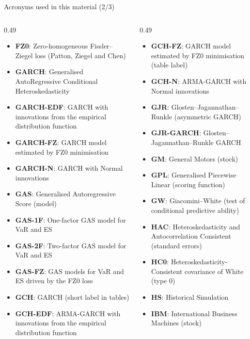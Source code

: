 \begin{frame}{Acronyms used in this material (2/3)}
\begin{columns}[T]
\begin{column}{0.49\textwidth}
\begin{itemize}\setlength{\itemsep}{0pt}
    \item \textbf{FZ0}: Zero-homogeneous Fissler–Ziegel loss (Patton, Ziegel and Chen)
    \item \textbf{GARCH}: Generalised AutoRegressive Conditional Heteroskedasticity
    \item \textbf{GARCH-EDF}: GARCH with innovations from the empirical distribution function
    \item \textbf{GARCH-FZ}: GARCH model estimated by FZ0 minimisation
    \item \textbf{GARCH-N}: GARCH with Normal innovations
    \item \textbf{GAS}: Generalised Autoregressive Score (model)
    \item \textbf{GAS-1F}: One-factor GAS model for VaR and ES
    \item \textbf{GAS-2F}: Two-factor GAS model for VaR and ES
    \item \textbf{GAS-FZ}: GAS models for VaR and ES driven by the FZ0 loss
    \item \textbf{GCH}: GARCH (short label in tables)
    \item \textbf{GCH-EDF}: ARMA-GARCH with innovations from the empirical distribution function
\end{itemize}
\end{column}
\begin{column}{0.49\textwidth}
\begin{itemize}\setlength{\itemsep}{0pt}
    \item \textbf{GCH-FZ}: GARCH model estimated by FZ0 minimisation (table label)
    \item \textbf{GCH-N}: ARMA-GARCH with Normal innovations
    \item \textbf{GJR}: Glosten–Jagannathan–Runkle (asymmetric GARCH)
    \item \textbf{GJR-GARCH}: Glosten–Jagannathan–Runkle GARCH
    \item \textbf{GM}: General Motors (stock)
    \item \textbf{GPL}: Generalised Piecewise Linear (scoring function)
    \item \textbf{GW}: Giacomini–White (test of conditional predictive ability)
    \item \textbf{HAC}: Heteroskedasticity and Autocorrelation Consistent (standard errors)
    \item \textbf{HC0}: Heteroskedasticity-Consistent covariance of White (type 0)
    \item \textbf{HS}: Historical Simulation
    \item \textbf{IBM}: International Business Machines (stock)
\end{itemize}
\end{column}
\end{columns}
\end{frame}
